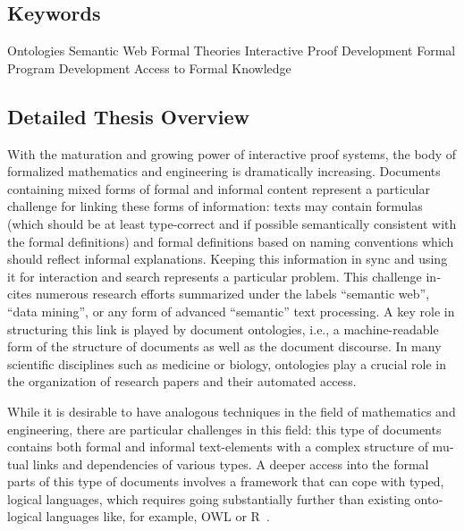 \documentclass[a4paper,10pt]{article}
\begin{document}
\begin{english}

\subsection*{Keywords}

Ontologies \textemdash{}
Semantic Web \textemdash{}
Formal Theories \textemdash{}
Interactive Proof Development \textemdash{}
Formal Program Development \textemdash{}
Access to Formal Knowledge

\subsection*{Detailed Thesis Overview}

With the maturation and growing power of interactive proof systems,
the body of formalized mathematics and engineering is dramatically increasing.
Documents containing mixed forms of formal and informal content
represent a particular challenge for linking these forms of information:
texts may contain formulas (which should be at least type-correct and
if possible semantically consistent with the formal definitions)
and formal definitions based on naming conventions which should reflect
informal explanations. Keeping this information in sync and
using it for interaction and search represents a particular problem.
This challenge incites numerous research efforts
summarized under the labels \enquote{semantic web}, \enquote{data mining},
or any form of advanced \enquote{semantic} text processing.
A key role in structuring this link is played by document ontologies,
i.e., a machine-readable form of the structure of documents
as well as the document discourse.
In many scientific disciplines such as medicine or biology,
ontologies play a crucial role in the organization of research papers
and their automated access.

While it is desirable to have analogous techniques
in the field of mathematics and engineering,
there are particular challenges in this field:
this type of documents contains both formal and informal text-elements
with a complex structure of mutual links and dependencies of various types.
A deeper access into the formal parts of this type of documents involves
a framework that can cope with typed, logical languages,
which requires going substantially further
than existing ontological languages
like, for example, OWL or R~\cite{owl2012,protege,owlgred,rontorium}.


\end{english}
\end{document}
